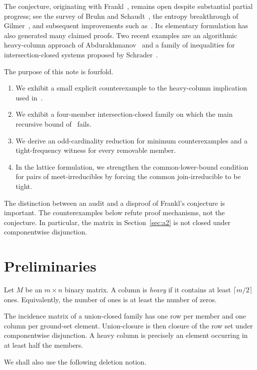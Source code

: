\documentclass[11pt]{amsart}
\theoremstyle{definition}
\theoremstyle{remark}
\begin{document}
The conjecture, originating with Frankl~\cite{Frankl1995}, remains open despite substantial partial progress; see the survey of Bruhn and Schaudt~\cite{BruhnSchaudt2015}, the entropy breakthrough of Gilmer~\cite{Gilmer2022}, and subsequent improvements such as~\cite{AlweissHuangSellke2024}. Its elementary formulation has also generated many claimed proofs. Two recent examples are an algorithmic heavy-column approach of Abdurakhmanov~\cite{AbdurakhmanovHeavy2026,AbdurakhmanovFrankl2026} and a family of inequalities for intersection-closed systems proposed by Schrader~\cite{Schrader2025}.

The purpose of this note is fourfold.
\begin{enumerate}[label=(\roman*)]
  \item We exhibit a small explicit counterexample to the heavy-column implication used in~\cite{AbdurakhmanovFrankl2026}.
  \item We exhibit a four-member intersection-closed family on which the main recursive bound of~\cite{Schrader2025} fails.
  \item We derive an odd-cardinality reduction for minimum counterexamples and a tight-frequency witness for every removable member.
  \item In the lattice formulation, we strengthen the common-lower-bound condition for pairs of meet-irreducibles by forcing the common join-irreducible to be tight.
\end{enumerate}

The distinction between an audit and a disproof of Frankl's conjecture is important. The counterexamples below refute proof mechanisms, not the conjecture. In particular, the matrix in Section~\ref{sec:a2} is not closed under componentwise disjunction.

\section{Preliminaries}

Let $M$ be an $m\times n$ binary matrix. A column is \emph{heavy} if it contains at least $\lceil m/2\rceil$ ones. Equivalently, the number of ones is at least the number of zeros.

The incidence matrix of a union-closed family has one row per member and one column per ground-set element. Union-closure is then closure of the row set under componentwise disjunction. A heavy column is precisely an element occurring in at least half the members.

We shall also use the following deletion notion.
\end{document}
